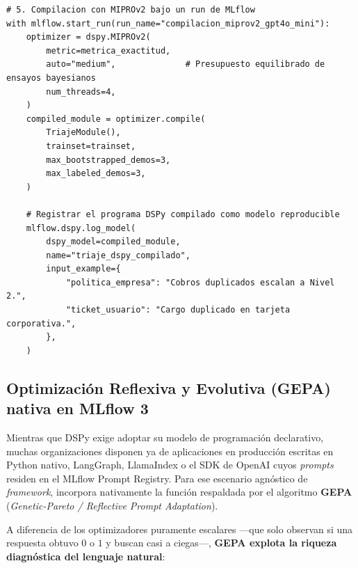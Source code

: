 \begin{lstlisting}[style=python, caption={Compilación automática de un módulo RAG/triaje con DSPy (\code{MIPROv2}) y seguimiento completo mediante \code{mlflow.dspy.autolog()}.}, label={lst:dspy-mlflow}]
# 5. Compilacion con MIPROv2 bajo un run de MLflow
with mlflow.start_run(run_name="compilacion_miprov2_gpt4o_mini"):
    optimizer = dspy.MIPROv2(
        metric=metrica_exactitud,
        auto="medium",              # Presupuesto equilibrado de ensayos bayesianos
        num_threads=4,
    )
    compiled_module = optimizer.compile(
        TriajeModule(),
        trainset=trainset,
        max_bootstrapped_demos=3,
        max_labeled_demos=3,
    )

    # Registrar el programa DSPy compilado como modelo reproducible
    mlflow.dspy.log_model(
        dspy_model=compiled_module,
        name="triaje_dspy_compilado",
        input_example={
            "politica_empresa": "Cobros duplicados escalan a Nivel 2.",
            "ticket_usuario": "Cargo duplicado en tarjeta corporativa.",
        },
    )
\end{lstlisting}

\subsection{Optimización Reflexiva y Evolutiva (GEPA) nativa en MLflow 3}\label{subsec:gepa-mlflow}

Mientras que DSPy exige adoptar su modelo de programación declarativo, muchas organizaciones disponen ya de aplicaciones en producción escritas en Python nativo, LangGraph, LlamaIndex o el SDK de OpenAI cuyos \textit{prompts} residen en el MLflow Prompt Registry. Para ese escenario agnóstico de \textit{framework},  incorpora nativamente la función  respaldada por el algoritmo \textbf{GEPA} (\textit{Genetic-Pareto / Reflective Prompt Adaptation}).

A diferencia de los optimizadores puramente escalares ---que solo observan si una respuesta obtuvo $0$ o $1$ y buscan casi a ciegas---, \textbf{GEPA explota la riqueza diagnóstica del lenguaje natural}:

